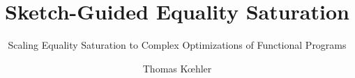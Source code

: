 \documentclass[acmsmall,nonacm]{acmart}\settopmatter{printfolios=true,printccs=false,printacmref=false}
\begin{document}
\title{Sketch-Guided Equality Saturation}         %
\subtitle{Scaling Equality Saturation to Complex Optimizations of Functional Programs}                     %

\newcommand{\ourcomments}[4]{\todo[color=#1]{\color{#2}#4}}

\newcommand{\tkcomment}[1]{\ourcomments{purple}{white}{TK}{#1}}
\newcommand{\pwtcomment}[1]{\ourcomments{blue}{white}{PWT}{#1}}
\newcommand{\michelcomment}[1]{\ourcomments{green}{black}{MS}{#1}}

\newcommand{\tkcommentforphil}[1]{\tkcomment{{\color{blue}Phil,} #1}}

\makeatletter
\global\let\tikz@ensure@dollar@catcode=\relax
\makeatother


\author{Thomas K{\oe}hler}
\end{document}
